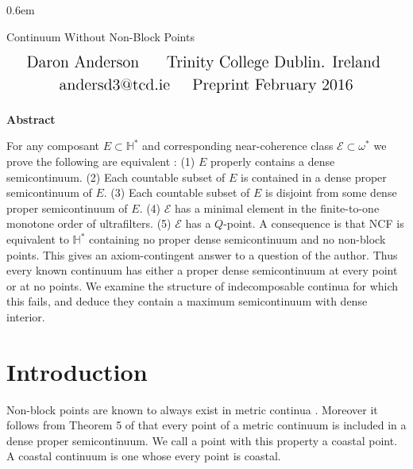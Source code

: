 \documentclass[12pt]{article}
\theoremstyle{plain}
\theoremstyle{definition}
\newcommand{\W}{\ensuremath{\omega}}
\newcommand{\HH}{\ensuremath{\mathbb H}}
\newcommand{\0}{\ensuremath{\varnothing}}
\newcommand{\sE}{\ensuremath{\mathscr E}}
\begin{document}
 

\openup 0.6em

\fontsize{13}{5}
\selectfont
 
	 
	
	\begin{center}\LARGE Continuum Without Non-Block Points
	\end{center}
	
	\begin{align*}
	\text{\Large Daron Anderson }  \qquad \text{\Large Trinity College Dublin. Ireland }  
	\end{align*} 
	\begin{align*} \text{\Large andersd3@tcd.ie} \qquad \text{\Large Preprint February 2016}  
	\end{align*}$ $\\
	
	
	
	\begin{center}
		\textbf{ \large Abstract}
	\end{center}
	
	\noindent
	For any composant $E \subset \HH^*$ and corresponding near-coherence class $\sE \subset \W^*$ we prove the following are equivalent : 
	(1) $E$ properly contains a dense semicontinuum. 
	(2) Each countable subset of $E$ is contained in a dense proper semicontinuum of $E$. 
	(3) Each countable subset of $E$ is disjoint from some dense proper semicontinuum of $E$. 
	(4) $\sE$ has a minimal element in the finite-to-one monotone order of ultrafilters. 
	(5) $\sE$ has a $Q$-point. 
	A consequence is that NCF is equivalent to $\HH^*$ containing no proper dense semicontinuum and no non-block points. 
	This gives an axiom-contingent answer to a question of the author. 
	Thus every known continuum has either a proper dense semicontinuum at every point or at no points. 
	We examine the structure of indecomposable continua for which this fails, and deduce they contain a maximum semicontinuum with dense interior.
	
	
	\section{Introduction} \noindent
	Non-block points are known to always exist in metric continua \cite{B,Leonel01}. 
	Moreover it follows from Theorem 5 of \cite{Bing01} that every point of a metric continuum is included in a dense proper semicontinuum. 
	We call a point with this property a coastal point. A coastal continuum is one whose every point is coastal.
	
\end{document}
